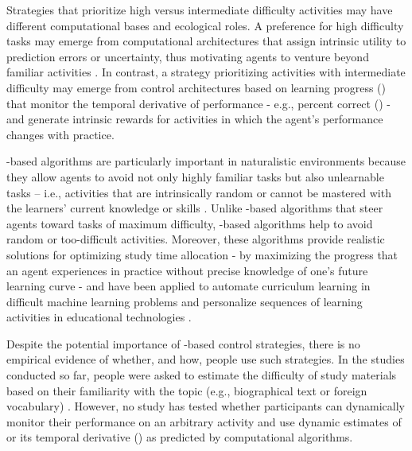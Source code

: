     Strategies that prioritize high versus intermediate difficulty activities may have different computational bases and ecological roles. A preference for high difficulty tasks may emerge from computational architectures that assign intrinsic utility to prediction errors or uncertainty, thus motivating agents to venture beyond familiar activities  \cite{dayan1996exploration,bellemare2016unifying,pathak2017curiosity,schulz2019structured}. In contrast, a strategy prioritizing activities with intermediate difficulty may emerge from control architectures based on learning progress ({\LP}) \cite{kaplan2007search,schmidhuber2010formal,graves2017automated,twomey2017curiosity,colas2019curious,kim2020active} that monitor the temporal derivative of performance - e.g., percent correct ({\PC}) - and generate intrinsic rewards for activities in which the agent's performance changes with practice.  

    {\LP}-based algorithms are particularly important in naturalistic environments because they allow agents to avoid not only highly familiar tasks but also unlearnable tasks – i.e., activities that are intrinsically random or cannot be mastered with the learners’ current knowledge or skills \cite{oudeyer2007intrinsic,forestier2017intrinsically,kim2020active}. Unlike {\PC}-based algorithms that steer agents toward tasks of maximum difficulty, {\LP}-based algorithms help to avoid random or too-difficult  activities. Moreover, these algorithms provide realistic solutions for optimizing study time allocation - by maximizing the progress that an agent experiences in practice without precise knowledge of one’s future learning curve \cite{son2006metacognitive,lopes2012strategic} - and have been applied to automate curriculum learning in difficult machine learning problems \cite{graves2017automated, matiisen2019teacher,portelas2020automatic} and personalize sequences of learning activities in educational technologies \cite{clement:hal-00913669,oudeyer2016intrinsic,mu2018combining}.

    Despite the potential importance of {\LP}-based control strategies, there is no empirical evidence of whether, and how, people use such strategies. In the studies conducted so far, people were asked to estimate the difficulty of study materials based on their familiarity with the topic (e.g., biographical text or foreign vocabulary) \cite{son2000metacognitive}. However, no study has tested whether participants can  dynamically monitor their performance on an arbitrary activity and use dynamic estimates of {\PC} or its temporal derivative ({\LP}) as predicted by computational algorithms. 

